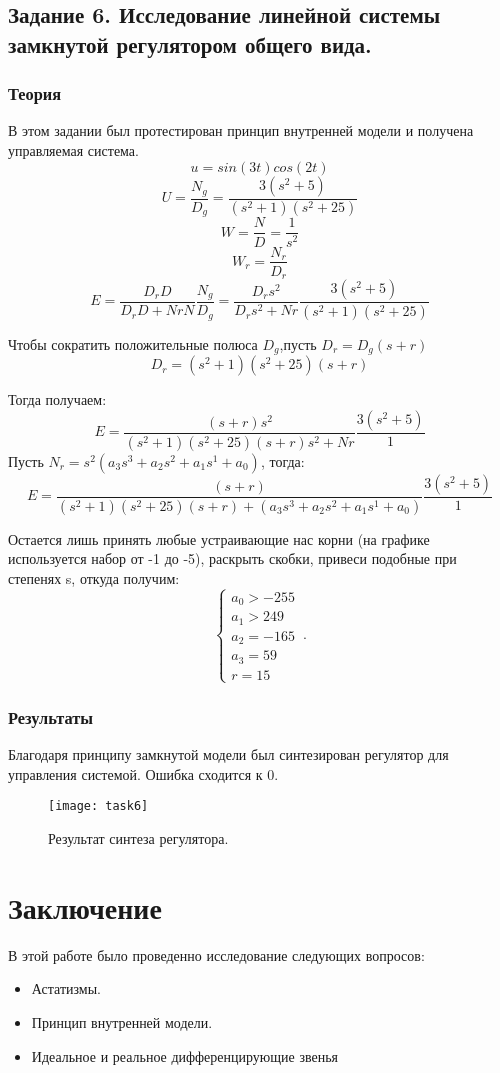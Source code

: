 \documentclass[16pt]{article}
\begin{document}
\subsection{Задание 6. Исследование линейной системы замкнутой регулятором общего вида.}

\subsubsection{Теория}
В этом задании был протестирован принцип внутренней модели и получена управляемая система.
\[u = sin(3t)cos(2t)\]
\[U = \frac{N_g}{D_g} = \frac{3(s^2+5)}{(s^2+1)(s^2+25)}\]
\[W = \frac{N}{D} = \frac{1}{s^2}\]
\[W_r = \frac{N_r}{D_r}\]
\[E = \frac{D_rD}{D_rD + NrN} \frac{N_g}{D_g} = \frac{D_rs^2}{D_rs^2 + Nr} \frac{3(s^2+5)}{(s^2+1)(s^2+25)} \]

Чтобы сократить положительные полюса \(D_g\),пусть \(D_r = D_g(s+r)\)
\[D_r = (s^2+1)(s^2+25)(s+r)\]

Тогда получаем:
\[E = \frac{(s+r)s^2}{(s^2+1)(s^2+25)(s+r)s^2 + Nr} \frac{3(s^2+5)}{1} \]
Пусть \(N_r = s^2(a_3s^3 + a_2s^2 + a_1s^1 + a_0)\), тогда:
\[E = \frac{(s+r)}{(s^2+1)(s^2+25)(s+r) + (a_3s^3 + a_2s^2 + a_1s^1 + a_0)} \frac{3(s^2+5)}{1} \]

Остается лишь принять любые устраивающие нас корни (на графике используется набор от -1 до -5), раскрыть скобки, привеси подобные при степенях s, откуда получим:
\begin{equation}
    \begin{cases}
        a_0 > -255\\
        a_1 > 249\\
        a_2 = -165\\
        a_3 = 59\\
        r = 15
    \end{cases}\,.
\end{equation}


\subsubsection{Результаты}
Благодаря принципу замкнутой модели был синтезирован регулятор для управления системой. Ошибка сходится к 0.
\begin{figure}[h!]
    \centering
    \texttt{[image: task6]}
    \caption{Результат синтеза регулятора.}
    \label{fig:fig13}
\end{figure}

\pagebreak
\pagebreak
\section{Заключение}
В этой работе было проведенно исследование следующих вопросов:
\begin{itemize}
    \item Астатизмы.
    \item Принцип внутренней модели.
    \item Идеальное и реальное дифференцирующие звенья
\end{itemize} 
\end{document}
